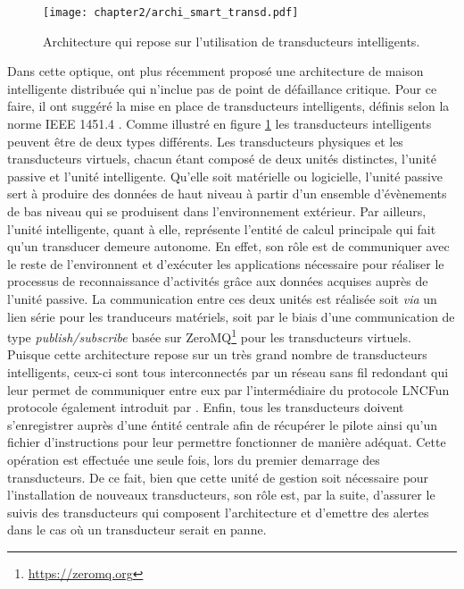 \begin{figure}[ht!]
	\centering
	\texttt{[image: chapter2/archi\_smart\_transd.pdf]}
	\caption{Architecture qui repose sur l'utilisation de transducteurs intelligents.}
	\label{fig:archi_smart_transd}
\end{figure}

Dans cette optique, \cite{Plantevin2018} ont plus récemment proposé une architecture de maison intelligente distribuée qui n'inclue
pas de point de défaillance critique. Pour ce faire, il ont suggéré la mise en place de transducteurs intelligents, définis selon la norme IEEE 1451.4 \citep{InstituteofElectricalandElectronicsEngineers1999}. Comme illustré en figure \ref{fig:archi_smart_transd} les transducteurs intelligents peuvent être de deux types différents. Les transducteurs physiques et les transducteurs virtuels, chacun étant composé de deux unités distinctes, l'unité passive et l'unité intelligente. Qu'elle soit matérielle ou logicielle, l'unité passive sert à produire des données de haut niveau à partir d'un ensemble d'évènements de bas niveau qui se produisent dans l'environnement extérieur. Par ailleurs, l'unité intelligente, quant à elle, représente l'entité de calcul principale qui fait qu'un transducer demeure autonome. En effet, son rôle est de communiquer avec le reste de l'environnent et d'exécuter les applications nécessaire pour réaliser le processus de reconnaissance d'activités grâce aux données acquises auprès de l'unité passive. La communication entre ces deux unités est réalisée soit \textit{via} un lien série pour les tranduceurs matériels, soit par le biais d'une communication de type \textit{publish/subscribe} basée sur ZeroMQ\footnote{\url{https://zeromq.org}} pour les transducteurs virtuels. Puisque cette architecture repose sur un très grand nombre de transducteurs intelligents, ceux-ci sont tous interconnectés par un réseau sans fil redondant qui leur permet de communiquer entre eux par l'intermédiaire du protocole \ac{LNCF}\textemdash un protocole également introduit par \cite{Plantevin2017}. Enfin, tous les transducteurs doivent s'enregistrer auprès d'une éntité centrale afin de récupérer le pilote ainsi qu'un fichier d'instructions pour leur permettre fonctionner de manière adéquat. Cette opération est effectuée une seule fois, lors du premier demarrage des transducteurs. De ce fait, bien que cette unité de gestion soit nécessaire pour l'installation de nouveaux transducteurs, son rôle est, par la suite, d'assurer le suivis des transducteurs qui composent l'architecture et d'emettre des alertes dans le cas où un transducteur serait en panne.

